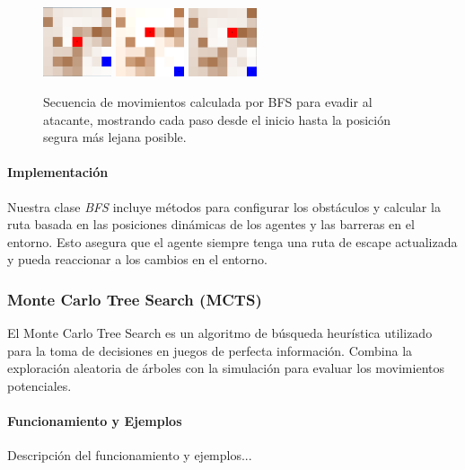 \documentclass[11pt]{article}
\begin{document}
\begin{figure}[H]
    \centering
    \includegraphics[width=0.18\textwidth]{images/image6.png}\hfill
    \includegraphics[width=0.18\textwidth]{images/image7.png}\hfill
    \includegraphics[width=0.18\textwidth]{images/image8.png}
    \caption{Secuencia de movimientos calculada por BFS para evadir al atacante, mostrando cada paso desde el inicio hasta la posición segura más lejana posible.}
\end{figure}

\paragraph{Implementación}
Nuestra clase \textit{BFS} incluye métodos para configurar los obstáculos y calcular la ruta basada en las posiciones dinámicas de los agentes y las barreras en el entorno. Esto asegura que el agente siempre tenga una ruta de escape actualizada y pueda reaccionar a los cambios en el entorno.



\subsubsection{Monte Carlo Tree Search (MCTS)}
El Monte Carlo Tree Search es un algoritmo de búsqueda heurística utilizado para la toma de decisiones en juegos de perfecta información. Combina la exploración aleatoria de árboles con la simulación para evaluar los movimientos potenciales.

\paragraph{Funcionamiento y Ejemplos}
Descripción del funcionamiento y ejemplos...
\end{document}
